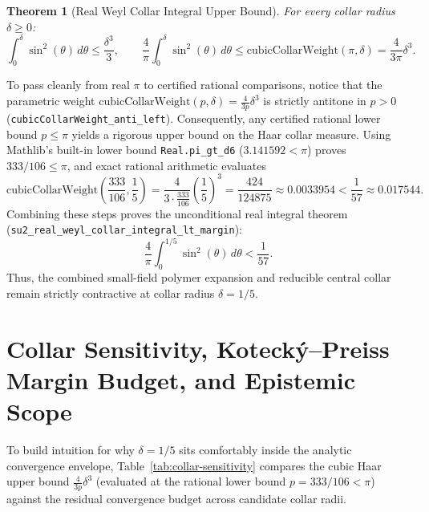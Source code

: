 \documentclass[11pt,a4paper]{article}
\newtheorem{theorem}{Theorem}[section]
\begin{document}
\begin{theorem}[Real Weyl Collar Integral Upper Bound]
For every collar radius $\delta \ge 0$:
\begin{equation}
\int_0^\delta \sin^2(\theta) \, d\theta \le \frac{\delta^3}{3}, \qquad \frac{4}{\pi} \int_0^\delta \sin^2(\theta) \, d\theta \le \mathrm{cubicCollarWeight}(\pi, \delta) = \frac{4}{3\pi} \delta^3.
\end{equation}
\end{theorem}

To pass cleanly from real $\pi$ to certified rational comparisons, notice that the parametric weight $\mathrm{cubicCollarWeight}(p, \delta) = \frac{4}{3p}\delta^3$ is strictly antitone in $p > 0$ (\texttt{cubicCollarWeight\_\-anti\_\-left}). Consequently, any certified rational lower bound $p \le \pi$ yields a rigorous upper bound on the Haar collar measure. Using Mathlib's built-in lower bound \texttt{Real.pi\_gt\_d6} ($3.141592 < \pi$) proves $333/106 \le \pi$, and exact rational arithmetic evaluates
\begin{equation}
\mathrm{cubicCollarWeight}\left(\frac{333}{106}, \frac{1}{5}\right) = \frac{4}{3 \cdot \frac{333}{106}} \left(\frac{1}{5}\right)^3 = \frac{424}{124875} \approx 0.0033954 < \frac{1}{57} \approx 0.017544.
\end{equation}
Combining these steps proves the unconditional real integral theorem (\texttt{su2\_\-real\_\-weyl\_\-collar\_\-integral\_\-lt\_\-margin}):
\begin{equation}
\frac{4}{\pi} \int_0^{1/5} \sin^2(\theta) \, d\theta < \frac{1}{57}.
\end{equation}
Thus, the combined small-field polymer expansion and reducible central collar remain strictly contractive at collar radius $\delta = 1/5$.

\section{Collar Sensitivity, Koteck\'y--Preiss Margin Budget, and Epistemic Scope}
To build intuition for why $\delta = 1/5$ sits comfortably inside the analytic convergence envelope, Table~\ref{tab:collar-sensitivity} compares the cubic Haar upper bound $\frac{4}{3p}\delta^3$ (evaluated at the rational lower bound $p = 333/106 < \pi$) against the residual convergence budget across candidate collar radii.
\end{document}
